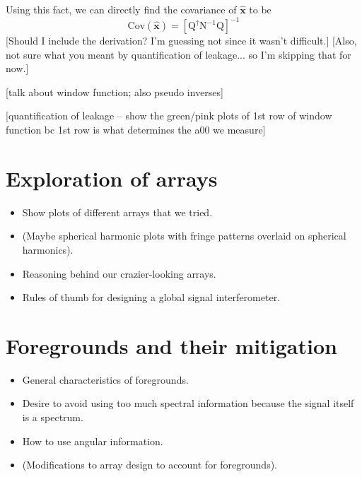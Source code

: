 \documentclass[twolcolumn,apj]{emulateapj}
\begin{document}
Using this fact, we can directly find the covariance of $\mathbf{\hat x}$ to be 
\begin{equation}
\textrm{Cov}(\mathbf{\hat x}) = [\textrm{Q}^\dagger \textrm{N}^{-1} \textrm{Q}]^{-1}
\end{equation}
[Should I include the derivation? I'm guessing not since it wasn't difficult.] [Also, not sure what you meant by quantification of leakage... so I'm skipping that for now.]

[talk about window function; also pseudo inverses]

[quantification of leakage -- show the green/pink plots of 1st row of window function bc 1st row is what determines the a00 we measure]


\section{Exploration of arrays}
\begin{itemize}
\item Show plots of different arrays that we tried.
\item (Maybe spherical harmonic plots with fringe patterns overlaid on spherical harmonics).
\item Reasoning behind our crazier-looking arrays.
\item Rules of thumb for designing a global signal interferometer.
\end{itemize}

\section{Foregrounds and their mitigation}
\begin{itemize}
\item General characteristics of foregrounds.
\item Desire to avoid using too much spectral information because the signal itself is a spectrum.
\item How to use angular information.
\item (Modifications to array design to account for foregrounds).
\end{itemize}
\end{document}
